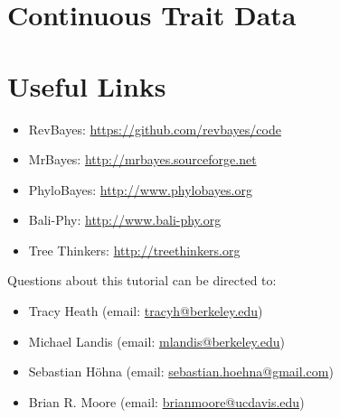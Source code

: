 \section{Continuous Trait Data}



\bigskip
\section*{Useful Links}

\begin{itemize}
\item RevBayes: \href{https://github.com/revbayes/code}{https://github.com/revbayes/code} \\ \vspace{-7mm}
\item MrBayes: \href{http://mrbayes.sourceforge.net/}{http://mrbayes.sourceforge.net} \\ \vspace{-7mm}
\item PhyloBayes: \href{http://megasun.bch.umontreal.ca/People/lartillot/www/index.htm}{http://www.phylobayes.org} \\ \vspace{-7mm}
\item Bali-Phy: \href{http://www.bali-phy.org/}{http://www.bali-phy.org} \\ \vspace{-7mm}
\item Tree Thinkers: \href{http://treethinkers.org/}{http://treethinkers.org} \\ \vspace{-7mm}
\end{itemize}

Questions about this tutorial can be directed to: \\\vspace{-10mm}
\begin{itemize}
\item Tracy Heath (email: \href{mailto:tracyh@berkeley.edu}{tracyh@berkeley.edu}) \\\vspace{-8mm}
\item Michael Landis (email: \href{mailto:mlandis@berkeley.edu}{mlandis@berkeley.edu}) \\\vspace{-8mm} 
\item Sebastian H\"{o}hna (email: \href{mailto:sebastian.hoehna@gmail.com}{sebastian.hoehna@gmail.com}) \\\vspace{-8mm}
\item Brian R. Moore (email: \href{mailto:brianmoore@ucdavis.edu}{brianmoore@ucdavis.edu}) \\\vspace{-8mm}
\end{itemize}



